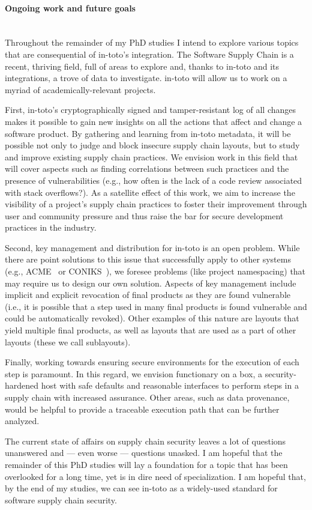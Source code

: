 \paragraph{Ongoing work and future goals}\mbox{}\\

Throughout the remainder of my PhD studies I intend to explore various topics
that are consequential of in-toto's integration. The Software Supply Chain is a
recent, thriving field, full of areas to explore and, thanks to in-toto and its
integrations, a trove of data to investigate. in-toto will allow us to work on
a myriad of academically-relevant projects.

First, in-toto's cryptographically signed and tamper-resistant log of all
changes makes it possible to gain new insights on all the actions that affect
and change a software product. By gathering and learning from in-toto metadata,
it will be possible not only to judge and block insecure supply chain layouts,
but to study and improve existing supply chain practices. We envision work in
this field that will cover aspects such as finding correlations between such
practices and the presence of vulnerabilities (e.g., how often is the lack of
a code review associated with stack overflows?). As a satellite effect of this
work, we aim to increase the visibility of a project's supply chain practices
to foster their improvement through user and community pressure and thus
raise the bar for secure development practices in the industry.

Second, key management and distribution for in-toto is an open problem. While
there are point solutions to this issue that successfully apply to other
systems (e.g., ACME~\cite{acme} or CONIKS~\cite{coniks}), we foresee problems
(like project namespacing) that may require us to design our own solution.
Aspects of key management include implicit and explicit revocation of final
products as they are found vulnerable (i.e., it is possible that a step used in
many final products is found vulnerable and could be automatically revoked).
Other examples of this nature are layouts that yield multiple final products,
as well as layouts that are used as a part of other layouts (these we call
sublayouts).

Finally, working towards ensuring secure environments for the execution of each
step is paramount. In this regard, we envision functionary on a box, a
security-hardened host with safe defaults and reasonable interfaces to perform
steps in a supply chain with increased assurance. Other areas, such as data
provenance, would be helpful to provide a traceable execution path that can be
further analyzed.

The current state of affairs on supply chain security leaves a lot of questions
unanswered and --- even worse --- questions unasked. I am hopeful that the
remainder of this PhD studies will lay a foundation for a topic that has been
overlooked for a long time, yet is in dire need of specialization. I am hopeful
that, by the end of my studies, we can see in-toto as a widely-used standard for
software supply chain security.
